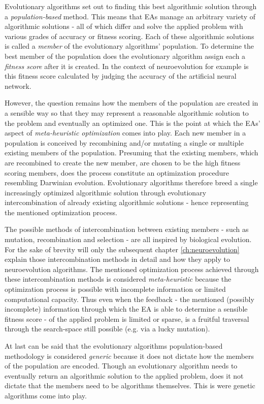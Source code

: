 \documentclass[journal, a4paper]{IEEEtran}
\begin{document}
Evolutionary algorithms set out to finding this best algorithmic solution through a \textit{population-based} method. This means that EAs manage an arbitrary variety of algorithmic solutions - all of which differ and solve the applied problem with various grades of accuracy or fitness scoring. Each of these algorithmic solutions is called a \textit{member} of the evolutionary algorithms' population. To determine the best member of the population does the evolutionary algorithm assign each a \textit{fitness score} after it is created. In the context of neuroevolution for example is this fitness score calculated by judging the accuracy of the artificial neural network.

However, the question remains how the members of the population are created in a sensible way so that they may represent a reasonable algorithmic solution to the problem and eventually an optimized one. This is the point at which the EAs' aspect of \textit{meta-heuristic optimization} comes into play. Each new member in a population is conceived by recombining and/or mutating a single or multiple existing members of the population. Presuming that the existing members, which are recombined to create the new member, are chosen to be the high fitness scoring members, does the process constitute an optimization procedure resembling Darwinian evolution. Evolutionary algorithms therefore breed a single increasingly optimized algorithmic solution through evolutionary intercombination of already existing algorithmic solutions - hence representing the mentioned optimization process. 

The possible methods of intercombination between existing members - such as mutation, recombination and selection - are all inspired by biological evolution.  For the sake of brevity will only the subsequent chapter \ref{ch:neuroevolution} explain those intercombination methods in detail and how they apply to neuroevolution algorithms. The mentioned optimization process achieved through these intercombination methods is considered \textit{meta-heuristic} because the optimization process is possible with incomplete information or limited computational capacity. Thus even when the feedback - the mentioned (possibly incomplete) information through which the EA is able to determine a sensible fitness score - of the applied problem is limited or sparse, is a fruitful traversal through the search-space still possible (e.g. via a lucky mutation).

At last can be said that the evolutionary algorithms population-based methodology is considered \textit{generic} because it does not dictate how the members of the population are encoded. Though an evolutionary algorithm needs to eventually return an algorithmic solution to the applied problem, does it not dictate that the members need to be algorithms themselves. This is were genetic algorithms come into play.
\end{document}
